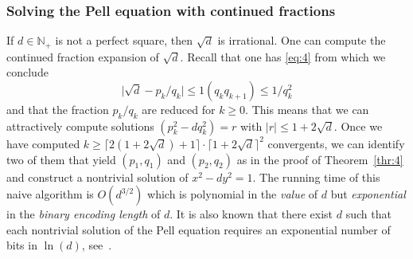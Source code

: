 \documentclass[a4paper,11pt,american]{article}
\newcommand{\N}{\mathbb{N}}
\theoremstyle{plain}
\theoremstyle{definition}
\begin{document}
  \subsubsection*{Solving the Pell equation with continued fractions}


  If $d \in \N_+$ is not a perfect square, then $\sqrt{d}$ is irrational. One can compute the continued fraction expansion of $\sqrt{d}$. Recall that one has  \eqref{eq:4} from which we conclude
  \begin{displaymath}
    \vert  \sqrt{d} - p_k / q_k \vert  \leq 1 (q_k q_{k+1}) \leq 1/ q_k^2 
  \end{displaymath}
  and that the fraction $p_k/q_k$ are reduced for $k\geq0$. This means that we can attractively compute solutions $(p_k^2 - d q_k^2) = r$ with $\vert r\vert  \leq 1 + 2 \sqrt{d}$. Once we have computed  $k \geq\lceil  2( 1  + 2\sqrt{d} ) +1 \rceil   \cdot \lceil 1 + 2 \sqrt{d}\rceil ^2 $ convergents,  we can identify two of them that yield $(p_1,q_1)$ and $(p_2,q_2)$ as in the proof of Theorem~\ref{thr:4} and construct a nontrivial solution of $x^2 - d y^2 = 1$. The running time of this naive algorithm is $O(d^{3/2})$  which is polynomial in the \emph{value } of  $d$ but \emph{exponential} in the \emph{binary encoding length} of $d$. It is also known that there exist $d$ such that each nontrivial solution of the Pell equation requires an exponential number of bits in $\ln (d)$, see~\cite{lenstra2002solving}. 
\end{document}
